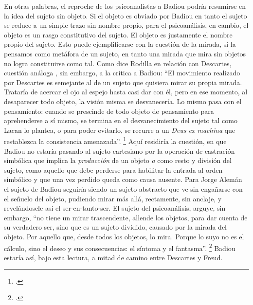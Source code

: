 En otras palabras, el reproche de los psicoanalistas a Badiou podría resumirse en la idea del sujeto sin objeto. Si el objeto es obviado por Badiou en tanto el sujeto se reduce a un simple trazo sin nombre propio, para el psicoanálisis, en cambio, el objeto es un rasgo constitutivo del sujeto. El objeto es justamente el nombre propio del sujeto. Esto puede ejemplificarse con la cuestión de la mirada, si la pensamos como metáfora de un sujeto, en tanto una mirada que mira sin objetos no logra constituirse como tal. Como dice Rodilla en relación con Descartes, cuestión análoga , sin embargo, a la crítica a Badiou: \enquote{El movimiento realizado por Descartes es semejante al de un sujeto que quisiera mirar su propia mirada. Trataría de acercar el ojo al espejo hasta casi dar con él, pero en ese momento, al desaparecer todo objeto, la visión misma se desvanecería. Lo mismo pasa con el pensamiento: cuando se prescinde de todo objeto de pensamiento para aprehenderse a sí mismo, se termina en el desvanecimiento del sujeto tal como Lacan lo plantea, o para poder evitarlo, se recurre a un \emph{Deus ex machina} que restablezca la consistencia amenazada}. \footcite[][141]{@7016-MARQUESRODILLA2001} Aquí residiría la cuestión, en que Badiou no estaría pasando al sujeto cartesiano por la operación de castración simbólica que implica la \emph{producción} de un objeto \emph{a} como resto y división del sujeto, como aquello que debe perderse para habilitar la entrada al orden simbólico y que una vez perdido queda como causa ausente. Para Jorge Alemán el sujeto de Badiou seguiría siendo un sujeto abstracto que ve sin engañarse con el señuelo del objeto, pudiendo mirar más allá, rectamente, sin anclaje, y revelándosele así el ser-en-tanto-ser. El sujeto del psicoanálisis, arguye, sin embargo, \enquote{no tiene un mirar trascendente, allende los objetos, para dar cuenta de su verdadero ser, sino que es un sujeto dividido, causado por la mirada del objeto. Por aquello que, desde todos los objetos, lo mira. Porque lo suyo no es el cálculo, sino el deseo y sus consecuencias: el síntoma y el fantasma}. \footcite[][220]{@7017-ALEMAN2000} Badiou estaría así, bajo esta lectura, a mitad de camino entre Descartes y Freud.

